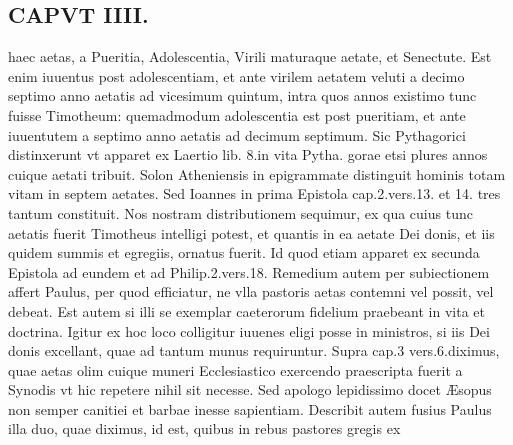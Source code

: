 \documentclass{article}
\begin{document}
\begin{pages}
\section*{CAPVT  IIII. }
\marginpar{[ p.229 ]}\pstart haec aetas, a Pueritia, Adolescentia, Virili maturaque aetate, et Senectute. Est enim iuuentus post adolescentiam, et ante virilem aetatem veluti a decimo septimo anno aetatis ad vicesimum quintum, intra quos annos existimo tunc fuisse Timotheum: quemadmodum adolescentia est post pueritiam, et ante iuuentutem a septimo anno aetatis ad decimum septimum. Sic Pythagorici distinxerunt vt apparet ex Laertio lib. 8.in vita Pytha. gorae etsi plures annos cuique aetati tribuit. Solon Atheniensis in epigrammate distinguit hominis totam vitam in septem aetates. Sed Ioannes in prima Epistola cap.2.vers.13. et 14. tres tantum constituit. Nos nostram distributionem sequimur, ex qua cuius tunc aetatis fuerit Timotheus intelligi potest, et quantis in ea aetate Dei donis, et iis quidem summis et egregiis, ornatus fuerit. Id quod etiam apparet ex secunda Epistola ad eundem et ad Philip.2.vers.18. Remedium autem per subiectionem affert Paulus, per quod efficiatur, ne vlla pastoris aetas contemni vel possit, vel debeat. Est autem si illi se exemplar caeterorum fidelium praebeant in vita et doctrina. Igitur ex hoc loco colligitur iuuenes eligi posse in ministros, si iis Dei donis excellant, quae ad tantum munus requiruntur. Supra cap.3 vers.6.diximus, quae aetas olim cuique muneri Ecclesiastico exercendo praescripta fuerit a Synodis vt hic repetere nihil sit necesse. Sed apologo lepidissimo docet Æsopus non semper canitiei et barbae inesse sapientiam. Describit autem fusius Paulus illa duo, quae diximus, id est, quibus in rebus pastores gregis ex  \pend

\end{pages}
\end{document}

